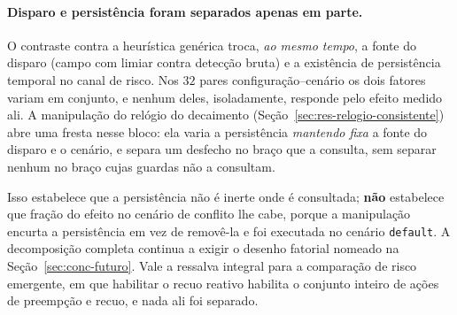\paragraph*{Disparo e persistência foram separados apenas em parte.} O contraste contra
a heurística genérica troca, \emph{ao mesmo tempo}, a fonte do disparo (campo com
limiar contra detecção bruta) e a existência de persistência temporal no canal de risco.
Nos $32$ pares configuração--cenário os dois fatores variam em conjunto, e nenhum deles,
isoladamente, responde pelo efeito medido ali. A manipulação do relógio do decaimento
(Seção~\ref{sec:res-relogio-consistente}) abre uma fresta nesse bloco: ela varia a
persistência \emph{mantendo fixa} a fonte do disparo e o cenário, e separa um desfecho no
braço que a consulta, sem separar nenhum no braço cujas guardas não a consultam.

Isso estabelece que a persistência não é inerte onde é consultada; \textbf{não} estabelece que fração do efeito no cenário de
conflito lhe cabe, porque a manipulação encurta a persistência em vez de removê-la e foi
executada no cenário \texttt{default}. A decomposição completa continua a exigir o
desenho fatorial nomeado na Seção~\ref{sec:conc-futuro}. Vale a ressalva integral para a
comparação de risco emergente, em que habilitar o recuo reativo habilita o conjunto
inteiro de ações de preempção e recuo, e nada ali foi separado.

